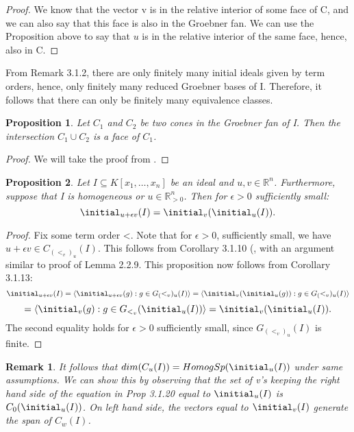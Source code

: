 \documentclass[12pt,a4paper]{report}
\newtheorem{proposition}{Proposition}
\newtheorem{remark}{Remark}
\begin{document}
\begin{proof}
We know that the vector v is in the relative interior of some face of C, and we can also say that this face is also in the Groebner fan. We can use the Proposition above to say that $u$ is in the relative interior of the same face, hence, also in C.
\end{proof}

From Remark 3.1.2, there are only finitely many initial ideals given by term orders, hence, only finitely many reduced Groebner bases of I. Therefore, it follows that there can only be finitely many equivalence classes.

\begin{proposition}
Let $C_{1}$ and $C_{2}$ be two cones in the Groebner fan of I. Then the intersection $C_{1} \cup C_{2}$ is a face of $C_{1}$.
\end{proposition}

\begin{proof}
We will take the proof from \cite{AndersPHD}.
\end{proof}

\begin{proposition}
Let $I \subseteq K[x_{1}, \ldots, x_{n}]$ be an ideal and $u, v \in \mathbb{R}^{n}$. Furthermore, suppose that I is homogeneous or $u \in \mathbb{R}_{> 0} ^{n}$. Then for $\epsilon > 0$ sufficiently small:
\begin{equation*}
    \initial_{u+ \epsilon v} (I) = \initial_{v} (\initial_{u} (I)).
\end{equation*}
\end{proposition}

\begin{proof}
Fix some term order <. Note that for $\epsilon > 0$, sufficiently small, we have $u + \epsilon v \in C_({{<}_{v}})_{u} (I)$. This follows from Corollary 3.1.10 (\cite{AndersPHD}, with an argument similar to proof of Lemma 2.2.9. This proposition now follows from Corollary 3.1.13:
\begin{equation*}
    \initial_{u + \epsilon v} (I) = \langle \initial_{u + \epsilon v} (g): g \in G_({<}_{v})_{u} (I) \rangle = \langle \initial_{v} (\initial_{u} (g)): g \in G_({<}_{v})_{u} (I) \rangle
\end{equation*}
\begin{equation*}
    = \langle \initial_{v} (g): g \in G_{{<}_{v}} (\initial_{u} (I)) \rangle = \initial_{v} (\initial_{u} (I)).
\end{equation*}
The second equality holds for $\epsilon > 0$ sufficiently small, since $G_({<}_{v})_{u} (I)$ is finite.
\end{proof}

\begin{remark}
It follows that $dim(C_{u} (I)) = HomogSp(\initial_{u} (I))$ under same assumptions. We can show this by observing that the set of v's keeping the right hand side of the equation in Prop 3.1.20 equal to $\initial_{u} (I)$ is $C_{0} (\initial_{u} (I))$. On left hand side, the vectors equal to $\initial_{v} (I)$ generate the span of $C_{w} (I)$.
\end{remark}
\end{document}
